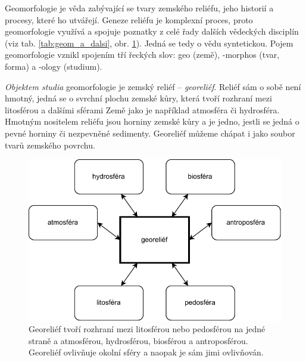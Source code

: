 Geomorfologie je věda zabývající se tvary zemského reliéfu, jeho historií a procesy, které ho utvářejí. Geneze reliéfu je komplexní proces, proto geomorfologie využívá a spojuje poznatky z celé řady dalších vědeckých disciplín (viz tab. \ref{tab:geom_a_dalsi}, obr. \ref{fig:diagramgeomorf}). Jedná se tedy o vědu syntetickou. Pojem geomorfologie vznikl spojením tří řeckých slov: geo (země), -morphos (tvar, forma) a -ology (studium).

\emph{Objektem studia} geomorfologie je zemský reliéf -- \emph{georeliéf}. Reliéf sám o sobě není hmotný, jedná se o svrchní plochu zemské kůry, která tvoří rozhraní mezi litosférou a dalšími sférami Země jako je například atmosféra či hydrosféra. Hmotným nositelem reliéfu jsou horniny zemské kůry a je jedno, jestli se jedná o pevné horniny či nezpevněné sedimenty. Georeliéf můžeme chápat i jako soubor tvarů zemského povrchu.

\begin{figure}[h]
	\centering
	\includegraphics[width=\linewidth]{obrazky/uvod/diagram_geomorf}
	\caption{Georeliéf tvoří rozhraní mezi litosférou nebo pedosférou na jedné straně a atmosférou, hydrosférou, biosférou a antroposférou. Georeliéf ovlivňuje okolní sféry a naopak je sám jimi ovlivňován.}
	\label{fig:diagramgeomorf}
\end{figure}


